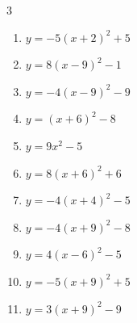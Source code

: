 \begin{multicols}{3}
\begin{enumerate}
        \phantom{$\displaystyle 頂点\left( -4 , -3 \right)$}

  \item $\displaystyle y=-5\left( x+2\right)^{2}+5$

        \phantom{$\displaystyle 頂点\left( -2 , 5 \right)$}

  \item $\displaystyle y=8\left( x-9\right)^{2}-1$

        \phantom{$\displaystyle 頂点\left( 9 , -1 \right)$}

  \item $\displaystyle y=-4\left( x-9\right)^{2}-9$

        \phantom{$\displaystyle 頂点\left( 9 , -9 \right)$}

  \item $\displaystyle y=\left( x+6\right)^{2}-8$

        \phantom{$\displaystyle 頂点\left( -6 , -8 \right)$}

  \item $\displaystyle y=9x^{2}-5$

        \phantom{$\displaystyle 頂点\left( 0 , -5 \right)$}

  \item $\displaystyle y=8\left( x+6\right)^{2}+6$

        \phantom{$\displaystyle 頂点\left( -6 , 6 \right)$}

  \item $\displaystyle y=-4\left( x+4\right)^{2}-5$

        \phantom{$\displaystyle 頂点\left( -4 , -5 \right)$}

  \item $\displaystyle y=-4\left( x+9\right)^{2}-8$

        \phantom{$\displaystyle 頂点\left( -9 , -8 \right)$}

  \item $\displaystyle y=4\left( x-6\right)^{2}-5$

        \phantom{$\displaystyle 頂点\left( 6 , -5 \right)$}

\columnbreak %

  \item $\displaystyle y=-5\left( x+9\right)^{2}+5$

        \phantom{$\displaystyle 頂点\left( -9 , 5 \right)$}

  \item $\displaystyle y=3\left( x+9\right)^{2}-9$


\end{enumerate}
\end{multicols}
